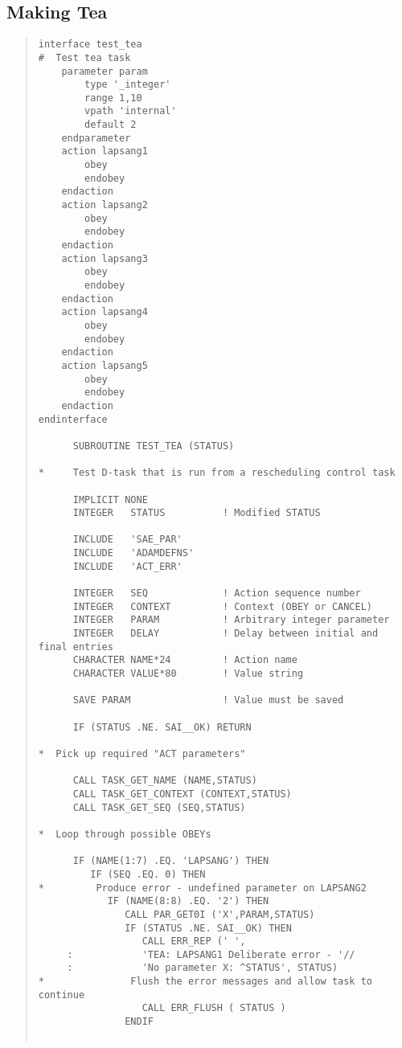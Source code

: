 \subsection{Making Tea}
\small \begin{quote} \begin{verbatim}
interface test_tea
#  Test tea task
    parameter param
        type '_integer'
        range 1,10
        vpath 'internal'
        default 2
    endparameter
    action lapsang1
        obey
        endobey
    endaction
    action lapsang2
        obey
        endobey
    endaction
    action lapsang3
        obey
        endobey
    endaction
    action lapsang4
        obey
        endobey
    endaction
    action lapsang5
        obey
        endobey
    endaction
endinterface

      SUBROUTINE TEST_TEA (STATUS)

*     Test D-task that is run from a rescheduling control task

      IMPLICIT NONE
      INTEGER   STATUS          ! Modified STATUS
 
      INCLUDE   'SAE_PAR'
      INCLUDE   'ADAMDEFNS'
      INCLUDE   'ACT_ERR'
 
      INTEGER   SEQ             ! Action sequence number
      INTEGER   CONTEXT         ! Context (OBEY or CANCEL)
      INTEGER   PARAM           ! Arbitrary integer parameter
      INTEGER   DELAY           ! Delay between initial and final entries
      CHARACTER NAME*24         ! Action name
      CHARACTER VALUE*80        ! Value string
 
      SAVE PARAM                ! Value must be saved

      IF (STATUS .NE. SAI__OK) RETURN

*  Pick up required "ACT parameters"

      CALL TASK_GET_NAME (NAME,STATUS)
      CALL TASK_GET_CONTEXT (CONTEXT,STATUS)
      CALL TASK_GET_SEQ (SEQ,STATUS)

*  Loop through possible OBEYs
 
      IF (NAME(1:7) .EQ. 'LAPSANG') THEN
         IF (SEQ .EQ. 0) THEN
*         Produce error - undefined parameter on LAPSANG2
            IF (NAME(8:8) .EQ. '2') THEN
               CALL PAR_GET0I ('X',PARAM,STATUS)
               IF (STATUS .NE. SAI__OK) THEN
                  CALL ERR_REP (' ',
     :            'TEA: LAPSANG1 Deliberate error - '//
     :            'No parameter X: ^STATUS', STATUS)
*               Flush the error messages and allow task to continue
                  CALL ERR_FLUSH ( STATUS )
               ENDIF


\end{verbatim}
\end{quote}
